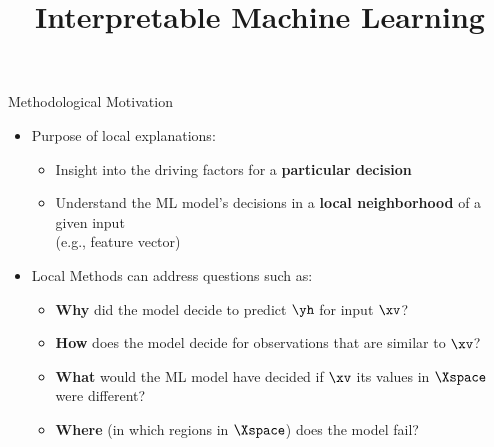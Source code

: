 \documentclass[11pt,compress,t,notes=noshow, aspectratio=169, xcolor=table]{beamer}
\title{Interpretable Machine Learning}
\date{}
\begin{document}



 \newcommand{\titlefigure}{figure/lime.png}
\newcommand{\learninggoals}{
\item Understand motivation for local explanations 
\item Develop an intuition for possible use-cases
\item Know characteristics of local explanation methods}



\begin{frame}[c]{Methodological Motivation}


	\begin{itemize}
	    \item Purpose of local explanations:
	    \begin{itemize}
	        \item Insight into the driving factors for a \textbf{particular decision}
	        \item Understand the ML model's decisions in a \textbf{local neighborhood} of a given input\\ (e.g., feature vector)
	    \end{itemize}
	    \medskip
	    \pause
		\item Local Methods can address questions such as: 
		\begin{itemize}
		    \item \textbf{Why} did the model decide to predict $\yh$ for input $\xv$?
		    \item \textbf{How} does the model decide for observations that are similar to $\xv$?
		    \item \textbf{What} would the ML model have decided if $\xv$ its values in $\Xspace$ were different?
		    \item  \textbf{Where} (in which regions in $\Xspace$) does the model fail?
		\end{itemize}  
	\end{itemize}
\end{frame}
\end{document}
